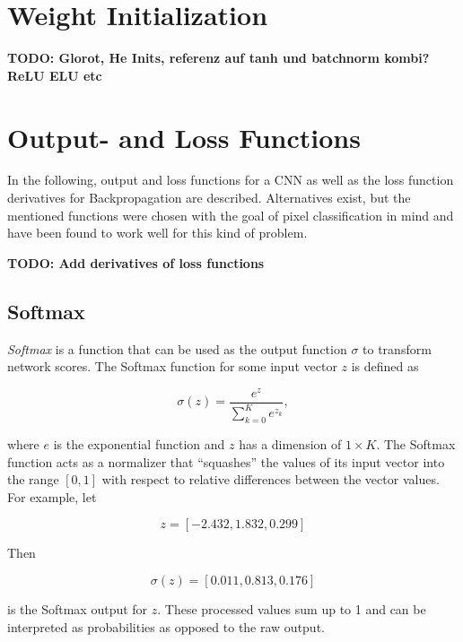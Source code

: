 	\section{Weight Initialization}

	\textbf{TODO: Glorot, He Inits, referenz auf tanh und batchnorm kombi? ReLU ELU etc}


	\section {Output- and Loss Functions}
In the following, output and loss functions for a CNN as well as the loss function derivatives for Backpropagation are described. Alternatives exist, but the mentioned functions were chosen with the goal of pixel classification in mind and have been found to work well for this kind of problem.

\textbf{TODO: Add derivatives of loss functions}

	\subsection{Softmax}
\label{subsec:softmax}

\textit{Softmax} is a function that can be used as the output function $\sigma$ to transform network scores. The Softmax function for some input vector $z$ is defined as

\[\sigma(z) = \frac{e^{z}}{\sum_{k=0}^{K} e^{z_k}},\]

\noindent where $e$ is the exponential function and $z$ has a dimension of $1 \times K$. The Softmax function acts as a normalizer that ``squashes'' the values of its input vector into the range $[0, 1]$ with respect to relative differences between the vector values. For example, let 

\[ z = [-2.432, 1.832, 0.299] \]

\noindent Then 

\[ \sigma(z) = [0.011, 0.813, 0.176] \]

\noindent is the Softmax output for $z$. These processed values sum up to 1 and can be interpreted as probabilities as opposed to the raw output.


%
%
%
%


